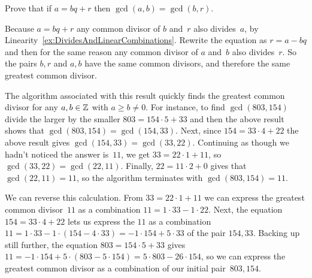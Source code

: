 \documentclass{ibl}  %
\begin{document}
\begin{euclidproof}
\begin{problem}
\end{problem}
\end{euclidproof}


\begin{bezoutproof}
\begin{problem}
Prove that if $a=bq+r$ then $\gcd(a,b)=\gcd(b,r)$.  
\begin{answer}
Because $a=bq+r$ any common divisor of $b$ and~$r$ also divides~$a$, 
by Linearity~\ref{ex:DividesAndLinearCombinations}.
Rewrite the equation as $r=a-bq$ and then for the same reason any
common divisor of $a$ and~$b$ also divides~$r$.
So the pairs $b,r$ and $a,b$ have the same common divisors, and
therefore the same greatest common divisor.
\end{answer}
\end{problem}

The algorithm associated with this result quickly finds the greatest common
divisor for any $a,b\in\mathbb{Z}$ with $a\geq b\neq 0$.  
For instance, to find $\gcd(803,154)$ divide the larger by
the smaller $803=154\cdot 5+33$ and then the above result shows that  
$\gcd(803,154)=\gcd(154,33)$.
Next, since $154=33\cdot 4+22$ the above result gives
$\gcd(154,33)=\gcd(33,22)$.
Continuing as though we hadn't noticed the answer is~$11$,
we get $33=22\cdot 1+11$, so $\gcd(33,22)=\gcd(22,11)$.
Finally, $22=11\cdot 2+0$ gives that 
$\gcd(22,11)=11$, so the algorithm terminates with $\gcd(803,154)=11$.

We can reverse this calculation.
From $33=22\cdot 1+11$ we can  
express the greatest common divisor~$11$ as a combination 
$11=1\cdot 33-1\cdot 22$.
Next, 
the equation $154=33\cdot 4+22$ lets us express
the $11$ as a combination 
$11=1\cdot 33-1\cdot (154-4\cdot 33)=-1\cdot 154+5\cdot 33$
of the pair $154,33$.
Backing up still further, the equation 
$803=154\cdot 5+33$
gives $11=-1\cdot 154+5\cdot (803-5\cdot 154)=5\cdot 803-26\cdot 154$, so 
we can express the greatest common divisor as a combination of our
initial pair~$803,154$.



\end{bezoutproof}
\end{document}
